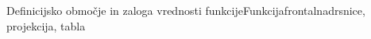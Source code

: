 \begin{priprava}{1}{}{Definicijsko območje in zaloga vrednosti funkcije}{Funkcija}{frontalna}{drsnice, projekcija, tabla}





\end{priprava}